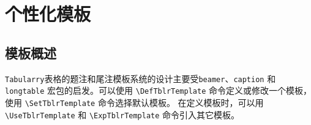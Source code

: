 \documentclass[oneside]{book}
\begin{document}
\section{个性化模板}

\subsection{模板概述}

\verb!Tabularry!表格的题注和尾注模板系统的设计主要受\verb!beamer!、\verb!caption! 和 \verb!longtable!
宏包的启发。可以使用 \verb!\DefTblrTemplate! 命令定义或修改一个模板，
使用 \verb!\SetTblrTemplate! 命令选择默认模板。
在定义模板时，可以用 \verb!\UseTblrTemplate! 和 \verb!\ExpTblrTemplate! 命令引入其它模板。
\end{document}
